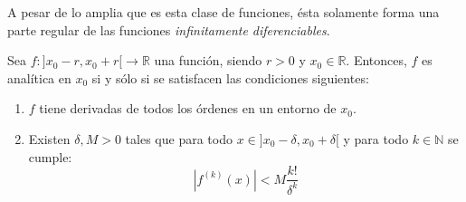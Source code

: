 \documentclass[12pt]{report}
\theoremstyle{largebreak}
\newcommand\abs[1]{\ensuremath{\left|#1\right|}}
\newcommand\cf[3]{\ensuremath{#1:#2\rightarrow#3}}
\begin{document}
    A pesar de lo amplia que es esta clase de funciones, ésta solamente forma una parte regular de las funciones \textit{infinitamente diferenciables}.

    \begin{propo}
        Sea $\cf{f}{]x_0-r,x_0+r[}{\mathbb{R}}$ una función, siendo $r>0$ y $x_0\in\mathbb{R}$. Entonces, $f$ es analítica en $x_0$ si y sólo si se satisfacen las condiciones siguientes:
        \begin{enumerate}
            \item $f$ tiene derivadas de todos los órdenes en un entorno de $x_0$.
            \item Existen $\delta,M>0$ tales que para todo $x\in]x_0-\delta,x_0+\delta[$ y para todo $k\in\mathbb{N}$ se cumple:
            \begin{equation*}
                \abs{f^{(k)}(x)}<M\frac{k!}{\delta^k}
            \end{equation*}
        \end{enumerate}
    \end{propo}
\end{document}
